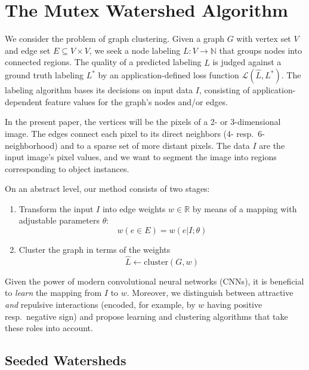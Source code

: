 
\cleardoublepage


\section{The Mutex Watershed Algorithm} \label{3_methods}

\noindent We consider the problem of graph clustering. Given a graph $G$ with vertex set $V$ and edge set $E\subseteq V\times V$, we seek a node labeling $L: V \rightarrow \mathbb{N}$ that groups nodes into connected regions. The quality of a predicted labeling $\hat L$ is judged against a ground truth labeling $L^*$ by an application-defined loss function $\mathcal{L}(\hat L, L^*)$. The labeling algorithm bases its decisions on input data $I$, consisting of application-dependent feature values for the graph's nodes and/or edges.

In the present paper, the vertices will be the pixels of a 2- or 3-dimensional image. The edges connect each pixel to its direct neighbors (4- resp.\ 6-neighborhood) and to a sparse set of more distant pixels. The data $I$ are the input image's pixel values, and we want to segment the image into regions corresponding to object instances. 

On an abstract level, our method consists of two stages:
\begin{enumerate}
\item Transform the input $I$ into edge weights $w\in \mathbb{R}$ by means of a mapping with adjustable parameters $\theta$:
\begin{equation}
w(e\in E) = w(e | I; \theta)
\end{equation}
\item Cluster the graph in terms of the weights
\begin{equation}
\hat L \leftarrow \mathrm{cluster}(G, w)
\end{equation}
\end{enumerate}
Given the power of modern convolutional neural networks (CNNs), it is beneficial to {\em learn} the mapping from $I$ to $w$. 
Moreover, we distinguish between attractive {\em and} repulsive interactions (encoded, for example, by $w$ having positive resp.\ negative sign) and propose learning and clustering algorithms that take these roles into account.

\subsection{Seeded Watersheds}


